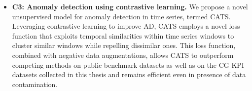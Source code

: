 \begin{itemize}
{    \textbf{Code:} \url{https://github.com/joelromanky/cg-ano-detect-eval}
    }
    

    
    
    \item \textbf{C3: Anomaly detection using contrastive learning.} We propose a novel unsupervised model for anomaly detection in time series, termed CATS. Leveraging contrastive learning to improve AD, CATS employs a novel loss function that exploits temporal similarities within time series windows to cluster similar windows while repelling dissimilar ones. This loss function, combined with negative data augmentations, allows CATS to outperform competing methods on public benchmark datasets as well as on the CG KPI datasets collected in this thesis and remains efficient even in presence of data contamination.
    
\end{itemize}
